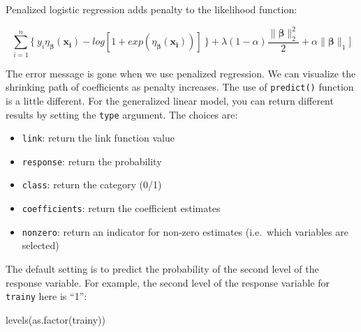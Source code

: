 \documentclass[
  12pt,
]{krantz}
\makeatletter
\newenvironment{Shaded}{\begin{snugshade}}{\end{snugshade}}
\newcommand{\AttributeTok}[1]{\textcolor[rgb]{0.61,0.61,0.61}{#1}}
\newcommand{\FunctionTok}[1]{\textcolor[rgb]{0,0,0}{#1}}
\newcommand{\NormalTok}[1]{#1}
\newcommand{\OtherTok}[1]{\textcolor[rgb]{0.37,0.37,0.37}{#1}}
\newcommand{\SpecialCharTok}[1]{\textcolor[rgb]{0,0,0}{#1}}
\newcommand{\StringTok}[1]{\textcolor[rgb]{0.5,0.5,0.5}{#1}}
\providecommand{\tightlist}{%
  \setlength{\itemsep}{0pt}\setlength{\parskip}{0pt}}
\newenvironment{kframe}{%
\medskip{}
\setlength{\fboxsep}{.8em}
 \def\at@end@of@kframe{}%
 \ifinner\ifhmode%
  \def\at@end@of@kframe{\end{minipage}}%
  \begin{minipage}{\columnwidth}%
 \fi\fi%
 \def\FrameCommand##1{\hskip\@totalleftmargin \hskip-\fboxsep
 \colorbox{shadecolor}{##1}\hskip-\fboxsep
     \hskip-\linewidth \hskip-\@totalleftmargin \hskip\columnwidth}%
 \MakeFramed {\advance\hsize-\width
   \@totalleftmargin\z@ \linewidth\hsize
   \@setminipage}}%
 {\par\unskip\endMakeFramed%
 \at@end@of@kframe}
\renewenvironment{Shaded}{\begin{kframe}}{\end{kframe}}
\makeatother
\begin{document}
Penalized logistic regression adds penalty to the likelihood function:

\[
\sum_{i=1}^{n}\{\ y_{i}\eta_{\mathbf{\beta}}(\mathbf{x_{i}})-log[1+exp(\eta_{\mathbf{\beta}}(\mathbf{x_{i}}))]\ \}+\lambda (1-\alpha) \frac{\parallel \mathbf{\beta}\parallel_{2}^{2}}{2} + \alpha \parallel \mathbf{\beta}\parallel _{1} ]
\]

\begin{Shaded}
\end{Shaded}

The error message is gone when we use penalized regression. We can visualize the shrinking path of coefficients as penalty increases. The use of \texttt{predict()} function is a little different. For the generalized linear model, you can return different results by setting the \texttt{type} argument. The choices are:

\begin{itemize}
\tightlist
\item
  \texttt{link}: return the link function value
\item
  \texttt{response}: return the probability
\item
  \texttt{class}: return the category (0/1)
\item
  \texttt{coefficients}: return the coefficient estimates
\item
  \texttt{nonzero}: return an indicator for non-zero estimates (i.e.~which variables are selected)
\end{itemize}

The default setting is to predict the probability of the second level of the response variable. For example, the second level of the response variable for \texttt{trainy} here is ``1'':

\begin{Shaded}
\begin{Highlighting}[]
\FunctionTok{levels}\NormalTok{(}\FunctionTok{as.factor}\NormalTok{(trainy))}
\end{Highlighting}
\end{Shaded}
\end{document}
